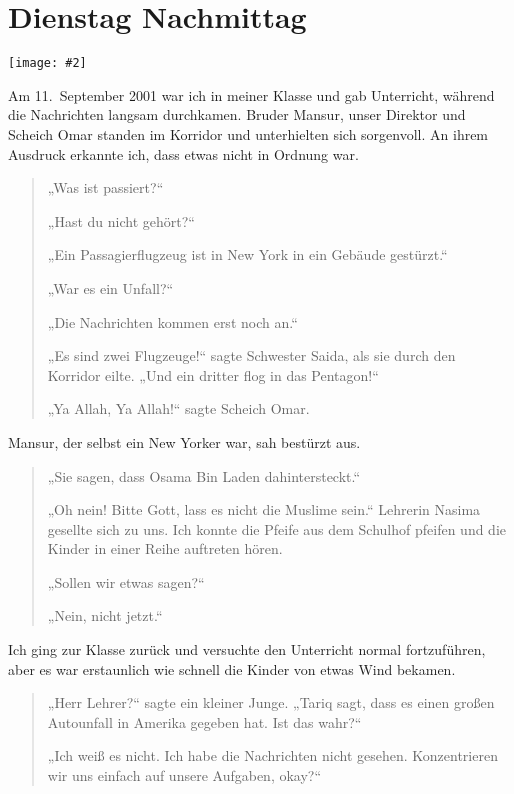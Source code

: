 \documentclass[12pt]{memoir}
\newcommand{\img}[3]{\begin{center}%
\texttt{[image: \#2]}\\{\small\em#3}%
\end{center}}
\begin{document}
\chapter{Dienstag Nachmittag}

\img{scale=0.4}{911_Second_Plane.jpg}{}

Am 11.\ September 2001 war ich in meiner Klasse und gab Unterricht,
während die Nachrichten langsam durchkamen.
Bruder Mansur, unser Direktor und Scheich Omar
standen im Korridor und unterhielten sich sorgenvoll.
An ihrem Ausdruck erkannte ich, dass etwas nicht in Ordnung war.

\begin{quote}
„Was ist passiert?“

„Hast du nicht gehört?“

„Ein Passagierflugzeug ist in New York in ein Gebäude gestürzt.“

„War es ein Unfall?“

„Die Nachrichten kommen erst noch an.“

„Es sind zwei Flugzeuge!“ sagte Schwester Saida,
als sie durch den Korridor eilte.
„Und ein dritter flog in das Pentagon!“

„Ya Allah, Ya Allah!“ sagte Scheich Omar.
\end{quote}

Mansur, der selbst ein New Yorker war, sah bestürzt aus.

\begin{quote}
„Sie sagen, dass Osama Bin Laden dahintersteckt.“

„Oh nein! Bitte Gott, lass es nicht die Muslime sein.“
Lehrerin Nasima gesellte sich zu uns.
Ich konnte die Pfeife aus dem Schulhof pfeifen
und die Kinder in einer Reihe auftreten hören.

„Sollen wir etwas sagen?“

„Nein, nicht jetzt.“
\end{quote}

Ich ging zur Klasse zurück und versuchte den Unterricht normal fortzuführen,
aber es war erstaunlich wie schnell die Kinder von etwas Wind bekamen.

\begin{quote}
„Herr Lehrer?“ sagte ein kleiner Junge.
„Tariq sagt, dass es einen großen Autounfall in Amerika gegeben hat.
Ist das wahr?“

„Ich weiß es nicht.
Ich habe die Nachrichten nicht gesehen.
Konzentrieren wir uns einfach auf unsere Aufgaben, okay?“
\end{quote}
\end{document}
